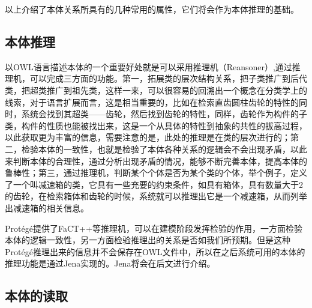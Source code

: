\documentclass[12pt,a4paper]{article}
\begin{document}
	\vspace{6pt}
	以上介绍了本体关系所具有的几种常用的属性，它们将会作为本体推理的基础。
	
	\subsection{本体推理}
	以OWL语言描述本体的一个重要好处就是可以采用推理机（Reansoner）,通过推理机，可以完成三方面的功能。第一，拓展类的层次结构关系，把子类推广到后代类，把超类推广到祖先类，这样一来，可以很容易的回溯出一个概念在分类学上的线索，对于语言扩展而言，这是相当重要的，比如在检索直齿圆柱齿轮的特性的同时，系统会找到其超类——齿轮，然后找到齿轮的特性，同样，齿轮作为构件的子类，构件的性质也能被找出来，这是一个从具体的特性到抽象的共性的拔高过程，以此获取更为丰富的信息，需要注意的是，此处的推理是在类的层次进行的；第二，检验本体的一致性，也就是检验了本体各种关系的逻辑会不会出现矛盾，以此来判断本体的合理性，通过分析出现矛盾的情况，能够不断完善本体，提高本体的鲁棒性；第三，通过推理机，判断某个个体是否为某个类的个体，举个例子，定义了一个叫减速箱的类，它具有一些充要的约束条件，如具有箱体，具有数量大于2的齿轮，在检索箱体和齿轮的时候，系统就可以推理出它是一个减速箱，从而列举出减速箱的相关信息。
	
	Prot{\'e}g{\'e}提供了FaCT++等推理机，可以在建模阶段发挥检验的作用，一方面检验本体的逻辑一致性，另一方面检验推理出的关系是否如我们所预期。但是这种Prot{\'e}g{\'e}推理出来的信息并不会保存在OWL文件中，所以在之后系统可用的本体的推理功能是通过Jena实现的。Jena将会在后文进行介绍。
	
	\subsection{本体的读取}
\end{document}

